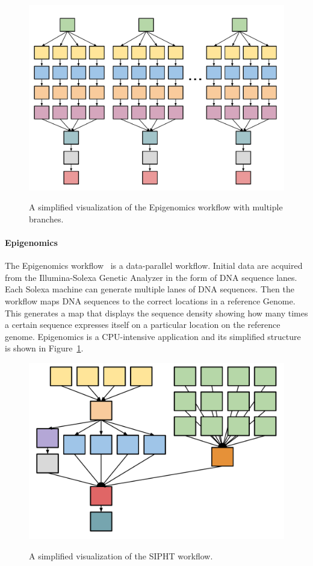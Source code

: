 \begin{figure}[htb]
	\centering
	\includegraphics[width=0.7\linewidth]{figures/workflowsim/genome_shape.pdf} \\
	\caption{A simplified visualization of the Epigenomics workflow with multiple branches.}
	\label{fig:model_shape_genome}
\end{figure}

\paragraph{\textbf{Epigenomics}}
The Epigenomics workflow~\cite{Epigenome} is a data-parallel workflow. Initial data are acquired from the Illumina-Solexa Genetic Analyzer in the form of DNA sequence lanes. Each Solexa machine can generate multiple lanes of DNA sequences. Then the workflow maps DNA sequences to the correct locations in a reference Genome. This generates a map that displays the sequence density showing how many times a certain sequence expresses itself on a particular location on the reference genome. Epigenomics is a CPU-intensive application and its simplified structure is shown in Figure~\ref{fig:model_shape_genome}. 

\begin{figure}[htb]
	\centering
	\includegraphics[width=0.5\linewidth]{figures/workflowsim/sipht_shape.pdf} \\
	\caption{A simplified visualization of the SIPHT workflow.}
	\label{fig:model_shape_sipht}
\end{figure}

